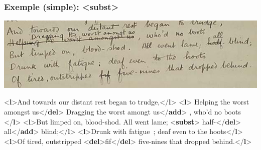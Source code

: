 \documentclass[]{beamer}\makeatletter
\begin{document}
\begin{frame}[fragile]
\frametitle{Exemple (simple): {\color{blue2}<subst>}}\par
                     \includegraphics[width=\textwidth]{../Graphics/PHowen.png}                 \par
                     
\bgroup\ttfamily\fontsize{8.5pt}{9pt}\selectfont\par
\begin{exampleblock}{}
\noindent\ttfamily\mbox{}{\color{blue1}<\textbf{l}>}And towards our distant rest began to trudge,{\color{blue1}</\textbf{l}>}\mbox{}\newline 
{\color{blue1}<\textbf{l}>}\mbox{}\newline 
{}\mbox{}\newline 
\hspace*{6pt}Helping the worst amongst us{\color{blue1}</\textbf{del}>}\mbox{}\newline 
\hspace*{6pt}Dragging the worst amongt us{\color{blue1}</\textbf{add}>}\mbox{}\newline 
{}, who’d no boots \mbox{}\newline 
{\color{blue1}</\textbf{l}>}\mbox{}\newline 
{\color{blue1}<\textbf{l}>}But limped on, blood-shod. All went lame; {\color{blue1}<\textbf{subst}>}\mbox{}\newline 
\hspace*{6pt}half-{\color{blue1}</\textbf{del}>}\mbox{}\newline 
\hspace*{6pt}all{\color{blue1}</\textbf{add}>}\mbox{}\newline 
{} blind;{\color{blue1}</\textbf{l}>}\mbox{}\newline 
{\color{blue1}<\textbf{l}>}Drunk with fatigue ; deaf even to the hoots{\color{blue1}</\textbf{l}>}\mbox{}\newline 
{\color{blue1}<\textbf{l}>}Of tired, outstripped {\color{blue1}<\textbf{del}>}fif{\color{blue1}</\textbf{del}>} five-nines that dropped behind.{\color{blue1}</\textbf{l}>}
\end{exampleblock}
\par\egroup
                       

\end{frame}
\end{document}
